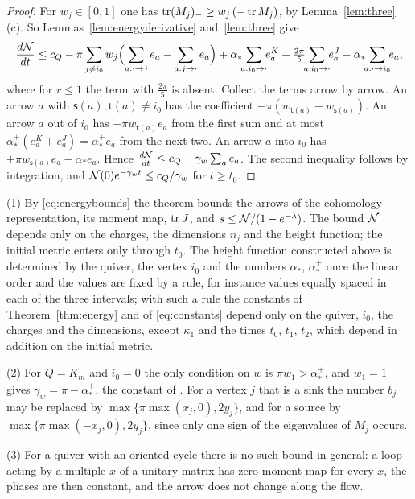 \begin{proof}
For $w_j\in[0,1]$ one has $\operatorname{tr}(M_j)_-\geq w_j\,(-\operatorname{tr} M_j)$, by
Lemma~\ref{lem:three}(c). So Lemmas~\ref{lem:energyderivative}
and~\ref{lem:three} give
\[
 \frac{d\cN}{dt}\leq c_Q-\pi\sum_{j\neq i_0}w_j\Bigl(\sum_{a:\cdot\to j}e_a-\sum_{a:j\to\cdot}e_a\Bigr)
 +\alpha_\ast\!\!\sum_{a:i_0\to\cdot}\!\!e_a^K+\tfrac{2\pi}5\!\!\sum_{a:i_0\to\cdot}\!\!e_a^J
 -\alpha_\ast\!\!\sum_{a:\cdot\to i_0}\!\!e_a,
\]
where for $r\leq1$ the term with $\frac{2\pi}5$ is absent. Collect the terms
arrow by arrow. An arrow $a$ with $\mathsf s(a),\mathsf t(a)\neq i_0$ has the coefficient
$-\pi(w_{\mathsf t(a)}-w_{\mathsf s(a)})$. An arrow $a$ out of $i_0$ has $-\pi w_{\mathsf t(a)}e_a$
from the first sum and at most $\alpha_\ast^+(e_a^K+e_a^J)=\alpha_\ast^+ e_a$ from
the next two. An arrow $a$ into $i_0$ has $+\pi w_{\mathsf s(a)}e_a-\alpha_\ast e_a$.
Hence $\frac{d\mathcal N}{dt}\leq c_Q-\gamma_w\sum_ae_a$. The second inequality
follows by integration, and
$\mathcal N(0)e^{-\gamma_wt}\leq c_Q/\gamma_w$ for $t\geq t_0$.
\end{proof}

\begin{remark}\label{rem:energy}
(1) By \eqref{eq:energybounds} the theorem bounds the arrows of the
cohomology representation, its moment map, $\operatorname{tr} J$, and
$s\leq\mathcal N/(1-e^{-\lambda})$. The bound $\bar{\mathcal N}$ depends only on the charges,
the dimensions $n_j$ and the height function; the initial metric enters only
through
$t_0$. The height function constructed above is determined by the quiver,
the vertex $i_0$ and the numbers $\alpha_\ast$, $\alpha_\ast^+$ once the
linear order and the values are fixed by a rule, for instance values equally
spaced in each of the three intervals; with such a rule the constants of
Theorem~\ref{thm:energy} and of \eqref{eq:constants} depend only on the
quiver, $i_0$, the charges and the dimensions, except $\kappa_1$ and the
times $t_0$, $t_1$, $t_2$, which depend in addition on the initial metric.

(2) For $Q=K_m$ and $i_0=0$ the only condition on $w$ is
$\pi w_1>\alpha_\ast^+$, and $w_1=1$ gives $\gamma_w=\pi-\alpha_\ast^+$, the
constant of \cite[Theorem~5.4]{wue26b}. For a vertex $j$ that is a sink the
number $b_j$ may be replaced by $\max\{\pi\max(x_j,0),2y_j\}$, and for a source
by $\max\{\pi\max(-x_j,0),2y_j\}$, since only one sign of the eigenvalues of
$M_j$ occurs.

(3) For a quiver with an oriented cycle there is no such bound in general: a
loop acting by a multiple $x$ of a unitary matrix has zero moment map for
every $x$, the phases are then constant, and the arrow does not change along
the flow.
\end{remark}

